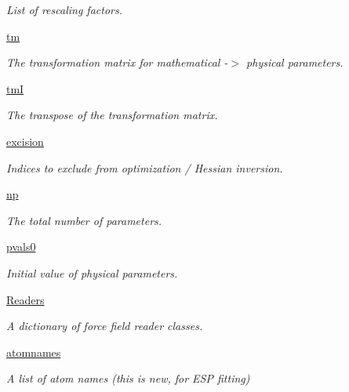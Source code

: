 \begin{DoxyCompactItemize}
\begin{DoxyCompactList}\small\item\em List of rescaling factors. \end{DoxyCompactList}\item 
\hyperlink{classforcebalance_1_1forcefield_1_1FF_aaf4763b05f3c1f7762d5c4d656ad106a}{tm}
\begin{DoxyCompactList}\small\item\em The transformation matrix for mathematical -\/$>$ physical parameters. \end{DoxyCompactList}\item 
\hyperlink{classforcebalance_1_1forcefield_1_1FF_a3a288d2514106e171af1d0e31311f97a}{tm\-I}
\begin{DoxyCompactList}\small\item\em The transpose of the transformation matrix. \end{DoxyCompactList}\item 
\hyperlink{classforcebalance_1_1forcefield_1_1FF_ad573c583207080fa66592bcbf788cbad}{excision}
\begin{DoxyCompactList}\small\item\em Indices to exclude from optimization / Hessian inversion. \end{DoxyCompactList}\item 
\hyperlink{classforcebalance_1_1forcefield_1_1FF_a19eb80acc94a49f9ff806f13a95fef66}{np}
\begin{DoxyCompactList}\small\item\em The total number of parameters. \end{DoxyCompactList}\item 
\hyperlink{classforcebalance_1_1forcefield_1_1FF_acfa4068ac91d195f89e65d6d725bb082}{pvals0}
\begin{DoxyCompactList}\small\item\em Initial value of physical parameters. \end{DoxyCompactList}\item 
\hyperlink{classforcebalance_1_1forcefield_1_1FF_a9db381836dba8b531ff7d45dce877f4f}{Readers}
\begin{DoxyCompactList}\small\item\em A dictionary of force field reader classes. \end{DoxyCompactList}\item 
\hyperlink{classforcebalance_1_1forcefield_1_1FF_ae18c15606b40f8c417cbfd6129554793}{atomnames}
\begin{DoxyCompactList}\small\item\em A list of atom names (this is new, for E\-S\-P fitting) \end{DoxyCompactList}\item 

\end{DoxyCompactItemize}
